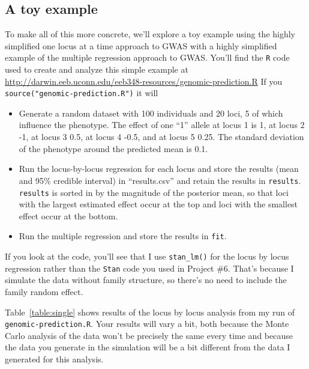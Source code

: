 \subsection*{A toy example}

To make all of this more concrete, we'll explore a toy example using
the highly simplified one locus at a time approach to GWAS with a
highly simplified example of the multiple regression approach to
GWAS. You'll find the {\tt R} code used to create and analyze this
simple example at
\url{http://darwin.eeb.uconn.edu/eeb348-resources/genomic-prediction.R}
If you {\tt source("genomic-prediction.R")} it will

\begin{itemize}

\item Generate a random dataset with 100 individuals and 20 loci, 5 of
  which influence the phenotype. The effect of one ``1'' allele at
  locus 1 is 1, at locus 2 -1, at locus 3 0.5, at locus 4 -0.5, and at
  locus 5 0.25. The standard deviation of the phenotype around the
  predicted mean is 0.1.

\item Run the locus-by-locus regression for each locus and store the
  results (mean and 95\% credible interval) in ``results.csv'' and
  retain the results in {\tt results}. {\tt results} is sorted in by
  the magnitude of the posterior mean, so that loci with the largest
  estimated effect occur at the top and loci with the smallest effect
  occur at the bottom.

\item Run the multiple regression and store the results in {\tt fit}. 
    
\end{itemize}

If you look at the code, you'll see that I use {\tt stan\_lm()} for the
locus by locus regression rather than the {\tt Stan} code you used in
Project \#6. That's because I simulate the data without family
structure, so there's no need to include the family random effect.

Table~\ref{table:single} shows results of the locus by locus analysis
from my run of {\tt genomic-prediction.R}. Your results will vary a
bit, both because the Monte Carlo analysis of the data won't be
precisely the same every time and because the data you generate in the
simulation will be a bit different from the data I generated for this
analysis.

